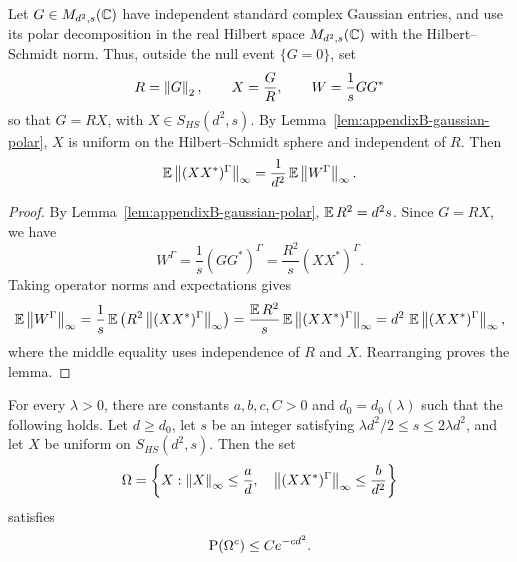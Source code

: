 \begin{revlatest}
\begin{lemma}
\label{lem:appendixB-radial-transfer-pt-operator}
Let \(G\in M_{d^2,s}(\mathbb{C})\) have independent standard complex Gaussian
entries, and use its polar decomposition in the real Hilbert space
\(M_{d^2,s}(\mathbb{C})\) with the Hilbert--Schmidt norm.  Thus, outside the null
event \(\{G=0\}\), set
\[
  R=\left\lVert G\right\rVert_2,\qquad X=\frac GR,\qquad W=\frac1s GG^*
\]
so that \(G=RX\), with \(X\in S_{HS}(d^2,s)\).  By
Lemma~\ref{lem:appendixB-gaussian-polar}, \(X\) is uniform on the
Hilbert--Schmidt sphere and independent of \(R\).  Then
\[
  \operatorname{\mathbb{E}}\left\lVert(XX^*)^\Gamma\right\rVert_\infty
  =
  \frac1{d^2}\operatorname{\mathbb{E}}\left\lVert W^\Gamma\right\rVert_\infty .
\]
\end{lemma}

\begin{proof}
By Lemma~\ref{lem:appendixB-gaussian-polar}, \(\operatorname{\mathbb{E}} R^2=d^2s\).  Since
\(G=RX\), we have
\[
  W^\Gamma
  =
  \frac1s(GG^*)^\Gamma
  =
  \frac{R^2}{s}(XX^*)^\Gamma .
\]
Taking operator norms and expectations gives
\[
  \operatorname{\mathbb{E}}\left\lVert W^\Gamma\right\rVert_\infty
  =
  \frac1s\operatorname{\mathbb{E}}\left(R^2\left\lVert(XX^*)^\Gamma\right\rVert_\infty\right)
  =
  \frac{\operatorname{\mathbb{E}} R^2}{s}\operatorname{\mathbb{E}}\left\lVert(XX^*)^\Gamma\right\rVert_\infty
  =
  d^2\,\operatorname{\mathbb{E}}\left\lVert(XX^*)^\Gamma\right\rVert_\infty,
\]
where the middle equality uses independence of \(R\) and \(X\).  Rearranging
proves the lemma.
\end{proof}
\end{revlatest}

\begin{proposition}
\label{prop:appendixB-good-set}
For every \(\lambda>0\), there are constants \(a,b,c,C>0\) and
\(d_0=d_0(\lambda)\) such that the following holds.  Let \(d\ge d_0\), let
\(s\) be an integer satisfying \(\lambda d^2/2\le s\le2\lambda d^2\), and
let \(X\) be uniform on \(S_{HS}(d^2,s)\).  Then the set
\[
  \Omega
  =
  \left\{
    X:\left\lVert X\right\rVert_\infty\le\frac a d,\quad
    \left\lVert(XX^*)^\Gamma\right\rVert_\infty\le\frac b{d^2}
  \right\}
\]
satisfies
\[
  \operatorname{P}(\Omega^c)\le C e^{-c d^2}.
\]
\end{proposition}

